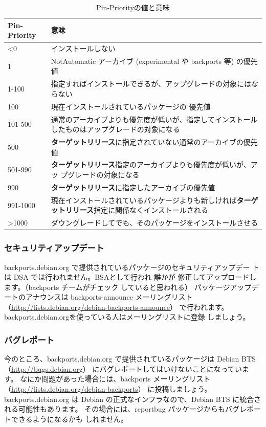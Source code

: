\documentclass[mingoth,a4paper]{jsarticle}
\begin{document}
\begin{table}[H]
 \begin{center}
  \caption{Pin-Priorityの値と意味}
  \label{tab:pinpriority}
  \begin{tabular}{|l|p{30em}|}
   \hline
   Pin-Priority & 意味 \\ \hline \hline
   \textless 0     & インストールしない \\
   1       & NotAutomatic アーカイブ (experimental や backports 等) の優先値 \\
   1-100   & 指定すればインストールできるが、アップグレードの対象にはならない\\
   100     & 現在インストールされているパッケージの 優先値\\
   101-500 & 通常のアーカイブよりも優先度が低いが、指定してインストールしたものはアップグレードの対象になる\\
   500     & {\bf{ターゲットリリース}}に指定されていない通常のアーカイブの優先値\\
   501-990 & {\bf{ターゲットリリース}}指定のアーカイブよりも優先度が低いが、アッ
   プグレードの対象になる\\
   990     & {\bf{ターゲットリリース}}に指定したアーカイブの優先値\\
   991-1000&現在インストールされているパッケージよりも新しければ{\bf{ターゲットリリース}}指定に関係なくインストールされる\\
   \textgreater 1000  & ダウングレードしてでも、そのパッケージをインストールさせる\\
   \hline
  \end{tabular}
 \end{center}
\end{table}

\subsubsection{セキュリティアップデート}
backports.debian.org で提供されているパッケージのセキュリティアップデー
トは DSA では行われません。BSAとして行われ 誰かが 修正してアップロードし
ます。（backports   チームがチェック していると思われる）
パッケージアップデートのアナウンスは
backports-announce メーリングリスト
（\url{http://lists.debian.org/debian-backports-announce}）
で行われます。backports.debian.orgを使っている人はメーリングリストに登録
しましょう。

\subsubsection{バグレポート}
今のところ、backports.debian.org で提供されているパッケージは Debian
BTS（\url{http://bugs.debian.org}） にバグレポートしてはいけないことになっています。
なにか問題があった場合には、backports メーリングリスト（\url{http://lists.debian.org/debian-backports}）
に投稿しましょう。
backports.debian.org は Debian の正式なインフラなので、Debian BTS に統合される可能性もあります。
その場合には、reportbug パッケージからもバグレポートできるようになるかも
しれません。
\end{document}

